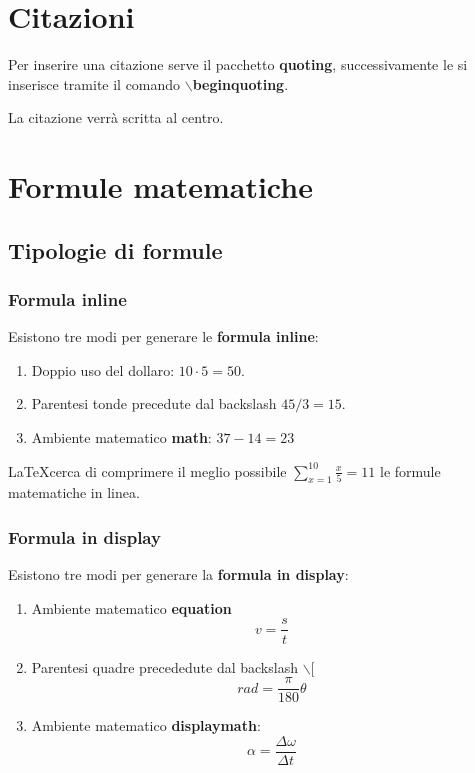 \documentclass[a4paper, 12pt]{book}
\theoremstyle{plain}
\begin{document}
	\section{Citazioni}
	
	Per inserire una citazione serve il pacchetto \textbf{quoting}, successivamente le si inserisce tramite il comando \textbf{$\backslash$begin{quoting}}.
	
	\begin{quoting}
		La citazione verrà scritta al centro.
	\end{quoting}

	\section{Formule matematiche}
	\subsection{Tipologie di formule}
	\subsubsection{Formula inline}
	Esistono tre modi per generare le \textbf{formula inline}:
	\begin{enumerate}
		\item Doppio uso del dollaro: $10\cdot 5 = 50$.
		\item Parentesi tonde precedute dal backslash \(45 / 3 = 15\).
		\item Ambiente matematico \textbf{math}: \begin{math}
		37 - 14 = 23
		\end{math}
	\end{enumerate}
	\LaTeX cerca di comprimere il meglio possibile $\sum_{x=1}^{10}\frac{x}{5} = 11$ le formule matematiche in linea.
	
	\subsubsection{Formula in display}
	Esistono tre modi per generare la \textbf{formula in display}:
	\begin{enumerate}
		\item Ambiente matematico \textbf{equation}
		\begin{equation}
		v = \frac{s}{t}
		\end{equation}
		\item Parentesi quadre precededute dal backslash $\backslash$[
		\[
		rad = \frac{\pi}{180}\theta
		\]
		\item Ambiente matematico \textbf{displaymath}:
		\begin{displaymath}
		\alpha = \frac{\Delta\omega}{\Delta t}
		\end{displaymath}
	\end{enumerate}
\end{document}
